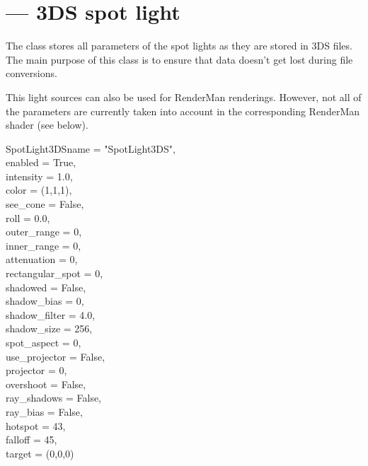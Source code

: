 
\section{ ---
         3DS spot light}

The  class stores all parameters of the spot lights
as they are stored in 3DS files. The main purpose of this class is to
ensure that data doesn't get lost during file conversions.

This light sources can also be used for RenderMan renderings. However,
not all of the parameters are currently taken into account in the
corresponding RenderMan shader (see below).

\begin{classdesc}{SpotLight3DS}{name = "SpotLight3DS",\\ 
                       enabled = True,\\
                       intensity = 1.0,\\
                       color = (1,1,1),\\
                       see_cone = False,\\
                       roll = 0.0,\\
                       outer_range = 0,\\
                       inner_range = 0,\\
                       attenuation = 0,\\
                       rectangular_spot = 0,\\
                       shadowed = False,\\
                       shadow_bias = 0,\\
                       shadow_filter = 4.0,\\
                       shadow_size = 256,\\
                       spot_aspect = 0,\\
                       use_projector = False,\\
                       projector = 0,\\
                       overshoot = False,\\
                       ray_shadows = False,\\
                       ray_bias = False,\\
                       hotspot = 43,\\
                       falloff = 45,\\
	               target = (0,0,0)
                  }


\end{classdesc}
